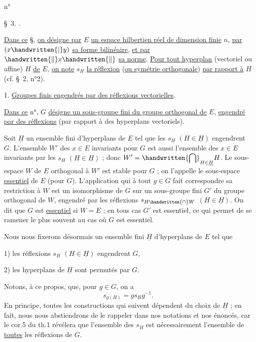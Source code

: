 \begin{flushright}n° \end{flushright}
\begin{center}\S\ 3. .\end{center}

\uline{Dans ce} \S, \uline{on désigne par} $E$ \uline{un espace hilbertien réel de dimension finie} $n$, \uline{par} $(x\handwritten{|}y)$ \uline{sa forme bilinéaire}, \uline{et par} $\handwritten{\lVert}x\handwritten{\rVert}$ \uline{sa norme}. \uline{Pour tout hyperplan} (vectoriel ou affine) $H$ \uline{de} $E$, \uline{on note} $s_H$ \uline{la réflexion} (\uline{ou symétrie orthogonale}) \uline{par rapport à} $H$ (cf. \S\ 2, n°2).

1. \uline{Groupes finis engendrés par des réflexions vectorielles}.

\uline{Dans ce} n°, $G$ \uline{désigne un sous-groupe fini du groupe orthogonal de} $E$, \uline{engendré par des réflexions} (par rapport à des hyperplans vectoriels).

Soit $\underline{H}$ un ensemble fini d'hyperplans de $E$ tel que les $s_H$ $(H\in\underline{H})$ engendrent $G$. L'ensemble $W'$ des $x\in E$ invariants pour $G$ est aussi l'ensemble des $x\in E$ invariants par les $s_H$ $(H\in\underline{H})$ ; donc $\displaystyle W'=\handwritten{\bigcap}_{H\in\underline{H}}H$. Le sous-espace $W$ de $E$ orthogonal à $W'$ est stable pour $G$ ; on l'appelle le sous-espace \uline{essentiel} de $E$ (pour $G$). L'application qui à tout $g\in G$ fait correspondre sa restriction à $W$ est un isomorphisme de $G$ sur un sous-groupe fini $G'$ du groupe orthogonal de $W$, engendré par les réflexions $s_{H\handwritten{\cap}W}$ $(H\in\underline{H})$. On dit que $G$ est \uline{essentiel} si $W=E$ ; en tous cas $G'$ est essentiel, ce qui permet de se ramener le plus souvent au cas où $G$ est essentiel.

Nous nous fixerons désormais un ensemble fini $\underline{H}$ d'hyperplans de $E$ tel que

1) les réflexions $s_H$ $(H\in\underline{H})$ engendrent $G$,

2) les hyperplans de $\underline{H}$ sont permutés par $G$.

Notons, à ce propos, que, pour $g\in G$, on a
\[
s_{g(H)}=gs_Hg^{-1}.
\tag*{(1)}
\]
En principe, toutes les constructions qui suivent dépendent du choix de $\underline{H}$ ; en fait, nous nous abstiendrons de le rappeler dans nos notations et nos énoncés, car le cor.5 du th.1 révélera que l'ensemble des $s_H$ est nécessairement l'ensemble de \uline{toutes} les réflexions de $G$.
